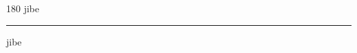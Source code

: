 
\begin{frame}
\begin{center}
\begin{turn}{180}
{\fontsize{2.5cm}{1em}\selectfont jibe}
\end{turn}
\vspace{1em}\par  
\hrule
\vspace{1em}\par  
{\fontsize{2.5cm}{1em}\selectfont jibe}
\end{center}
\end{frame}
